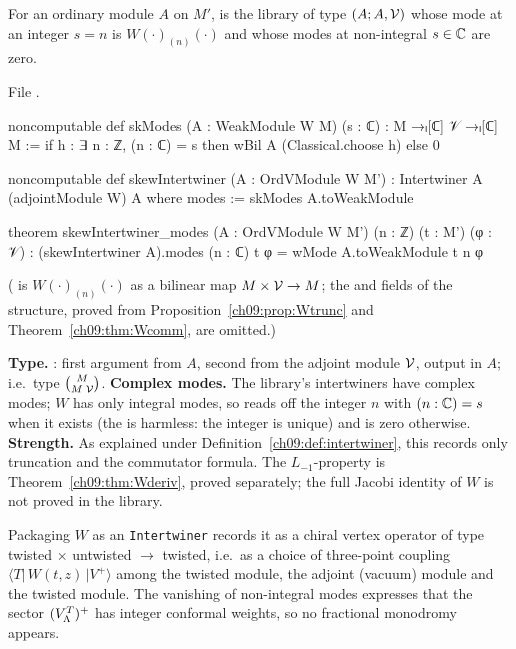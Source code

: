 \begin{definition}\label{ch09:def:skewInt}
For an ordinary module $A$ on $M'$,  is the library 
of type $(A;A,\mathcal{V})$ whose mode at an integer $s=n$ is $W(\cdot)_{(n)}(\cdot)$ and whose modes
at non-integral $s\in{\mathbb{C}}$ are zero.
\end{definition}
\noindent File .
\begin{leancode}
noncomputable def skModes (A : WeakModule W M) (s : ℂ) : M →ₗ[ℂ] 𝒱 →ₗ[ℂ] M :=
  if h : ∃ n : ℤ, (n : ℂ) = s then wBil A (Classical.choose h) else 0

noncomputable def skewIntertwiner (A : OrdVModule W M') :
    Intertwiner A (adjointModule W) A where
  modes := skModes A.toWeakModule

theorem skewIntertwiner_modes (A : OrdVModule W M') (n : ℤ) (t : M') (φ : 𝒱) :
    (skewIntertwiner A).modes (n : ℂ) t φ = wMode A.toWeakModule t n φ
\end{leancode}
( is $W(\cdot)_{(n)}(\cdot)$ as a bilinear map $M\times\mathcal{V}\to M$; the
 and  fields of the structure, proved from
Proposition~\ref{ch09:prop:Wtrunc} and Theorem~\ref{ch09:thm:Wcomm}, are omitted.)

\begin{dictionary}
\textbf{Type.} : first argument from $A$, second from the
adjoint module $\mathcal{V}$, output in $A$; i.e.\ type $\binom{M}{M\;\mathcal{V}}$.
\textbf{Complex modes.} The library's intertwiners have complex modes; $W$ has only integral modes,
so  reads off the integer $n$ with $(n:{\mathbb{C}})=s$ when it exists (the
 is harmless: the integer is unique) and is zero otherwise.
\textbf{Strength.} As explained under Definition~\ref{ch09:def:intertwiner}, this records only
truncation and the commutator formula. The $L_{-1}$-property is Theorem~\ref{ch09:thm:Wderiv},
proved separately; the full Jacobi identity of $W$ is not proved in the library.
\end{dictionary}

\begin{physics}
Packaging $W$ as an \texttt{Intertwiner} records it as a chiral vertex operator of type twisted $\times$ untwisted $\to$ twisted, i.e.\ as a choice of three-point coupling $\langle T|\,W(t,z)\,|V^+\rangle$ among the twisted module, the adjoint (vacuum) module and the twisted module. The vanishing of non-integral modes expresses that the sector $(V_{\Lambda}^{T})^{+}$ has integer conformal weights, so no fractional monodromy appears.
\end{physics}

